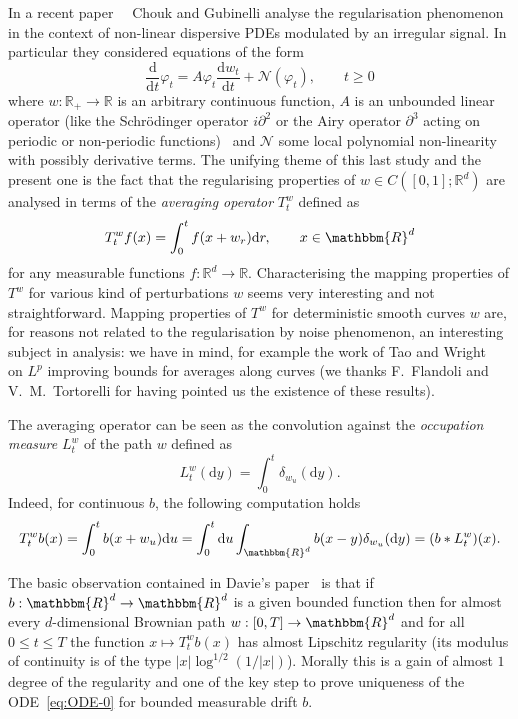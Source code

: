 \documentclass[a4paper,11pt]{article}
\newcommand{\mathd}{\mathrm{d}}
\newcommand{\tmtextit}[1]{{\itshape{#1}}}
\newcommand{\CN}{\mathscr N}
\newcommand{\RR}{\mathbb R}
\begin{document}
In a recent paper~{\cite{random-modulation-1,random-modulation-2}} \ Chouk
and Gubinelli analyse the regularisation phenomenon in the context of
non-linear dispersive PDEs modulated by an irregular signal. In particular
they considered equations of the form
\begin{equation}
  \label{eq:abs} \frac{\mathd}{\mathd t} \varphi_{t} =A \varphi_{t} 
  \frac{\mathd w_{t}}{\mathd t} +\CN ( \varphi_{t} ) , \hspace{2em} t
  \ge 0
\end{equation}
where $w: \RR_{+} \to \RR$ is an arbitrary continuous function, $A$ is an
unbounded linear operator (like the Schr\"odinger operator $i \partial^{2}$ or
the Airy operator $\partial^{3}$ acting on periodic or non-periodic functions)
\ and $\CN$ some local polynomial non-linearity with possibly
derivative terms. The unifying theme of this last study and the present one is
the fact that the regularising properties of $w \in C ([0,1]; \RR^{d} )$ are
analysed in terms of the \tmtextit{averaging operator} $T^{w}_{t}$ defined as
\begin{equation}
  T^{w}_{t} f (x) = \int_{0}^{t} f (x+w_{r} ) \mathd r, \hspace{2em} x \in
  \mathbbm{R}^{d} \label{eq:averaging-op}
\end{equation}
for any measurable functions $f: \RR^{d} \to \RR$. Characterising the mapping
properties of $T^{w}$ for various kind of perturbations $w$ seems very
interesting and not straightforward. Mapping properties of $T^{w}$ for
deterministic smooth curves $w$ are, for reasons not related to the
regularisation by noise phenomenon, an interesting subject in analysis: we
have in mind, for example the work of Tao and Wright~{\cite{tao}} on $L^{p}$
improving bounds for averages along curves (we thanks F.~Flandoli and
V.~M.~Tortorelli for having pointed us the existence of these results). \



The averaging operator can be seen as the convolution against the
\tmtextit{occupation measure} $L^{w}_{t}$ of the path $w$ defined as
\[ L^{w}_{t} ( \mathd y ) = \int_{0}^{t } \delta_{w_{u}} ( \mathd y ) . \]
Indeed, for continuous $b$, the following computation holds
\[ T^{w}_{t} b ( x ) = \int_{0}^{t} b ( x+w_{u} ) \mathd u = \int_{0}^{t}
   \mathd u \int_{\mathbbm{R}^{d}}  b ( x-y ) \delta_{w_{u}} ( \mathd y ) = (
   b \ast L_{t}^{w} ) ( x ) . \]


The basic observation contained in Davie's paper~{\cite{MR2377011}} is that if
$b:\mathbbm{R}^{d} \rightarrow \mathbbm{R}^{d}$ is a given bounded function
then for almost every $d$-dimensional Brownian path $w: [ 0,T ] \rightarrow
\mathbbm{R}^{d}$ and for all $0 \leqslant t \leqslant T$ the function $x
\mapsto T^{w}_{t} b ( x )$ has almost Lipschitz regularity (its modulus of
continuity is of the type $| x | \log^{1/2}_{} ( 1/ | x | )$). Morally this is
a gain of almost $1$ degree of the regularity and one of the key step to prove
uniqueness of the ODE~{\eqref{eq:ODE-0}} for bounded measurable drift $b$.
\end{document}
